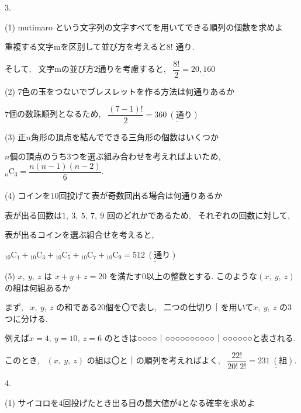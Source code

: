 \documentclass[dvipdfmx]{jsarticle}
\begin{document}
\bigskip
\bigskip

3.

(1) mutimaro という文字列の文字すべてを用いてできる順列の個数を求めよ

\bigskip

重複する文字mを区別して並び方を考えると$8!$ 通り. 

そして, \ 文字mの並び方$2$通りを考慮すると, \ $\dfrac{8!}{2} = \underline{20{,}160}$

\bigskip
\bigskip

(2) $7$色の玉をつないでブレスレットを作る方法は何通りあるか

\bigskip

$7$個の数珠順列となるため, \ $\dfrac{(7-1)!}{2} = \underline{360 \ (通り)}$

\bigskip
\bigskip

(3) 正$n$角形の頂点を結んでできる三角形の個数はいくつか

\bigskip

$n$個の頂点のうち$3$つを選ぶ組み合わせを考えればよいため, \ 
${}_n \mathrm{C}_3 = \underline{\dfrac{n(n-1)(n-2)}{6}}$.

\newpage

(4) コインを$10$回投げて表が奇数回出る場合は何通りあるか

\bigskip

表が出る回数は$1, \ 3, \ 5, \ 7, \ 9$ 回のどれかであるため, \ それぞれの回数に対して, \ 

表が出るコインを選ぶ組合せを考えると, \ 

${}_{10} \mathrm{C}_1 + {}_{10} \mathrm{C}_3 + {}_{10} \mathrm{C}_5 + {}_{10} \mathrm{C}_7 + {}_{10} \mathrm{C}_9 = \underline{512 \ (通り)}$

\bigskip
\bigskip

(5) $x, \ y, \ z$ は $x + y + z = 20$ を満たす$0$以上の整数とする. このような$(x, \ y, \ z)$ の組は何組あるか

\bigskip

まず, \ $x, \ y, \ z$ の和である$20$個を〇で表し, \ 二つの仕切り｜を用いて$x, \ y, \ z$ の$3$つに分ける.

例えば$x=4, \ y=10, \ z=6$ のときは○○○○｜○○○○○○○○○○｜○○○○○○と表される.

このとき, \ $(x, \ y, \ z)$ の組は〇と｜の順列を考えればよく, \ $\dfrac{22!}{20! \ 2!} = \underline{231 \ (組)}$.

\bigskip
\bigskip

4.

(1) サイコロを$4$回投げたとき出る目の最大値が$4$となる確率を求めよ
\end{document}
